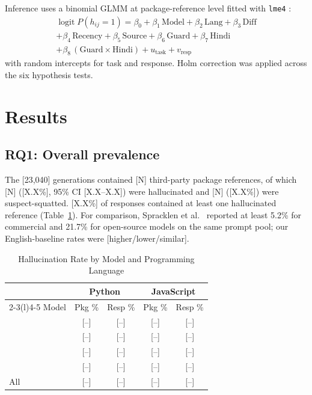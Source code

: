 \documentclass[conference]{IEEEtran}
\begin{document}
Inference uses a binomial GLMM at package-reference level fitted with \texttt{lme4} \cite{bates2015}:
\begin{multline}
\operatorname{logit} P(h_{ij}=1) = \beta_0 + \beta_1\,\text{Model} + \beta_2\,\text{Lang} + \beta_3\,\text{Diff} \\
+ \beta_4\,\text{Recency} + \beta_5\,\text{Source} + \beta_6\,\text{Guard} + \beta_7\,\text{Hindi} \\
+ \beta_8\,(\text{Guard}\times\text{Hindi}) + u_{\text{task}} + v_{\text{resp}}
\end{multline}
with random intercepts for task and response. Holm correction \cite{holm1979} was applied across the six hypothesis tests.

\section{Results}
\subsection{RQ1: Overall prevalence}
The [23,040] generations contained [N] third-party package references, of which [N] ([X.X\%], 95\% CI [X.X--X.X]) were hallucinated and [N] ([X.X\%]) were suspect-squatted. [X.X\%] of responses contained at least one hallucinated reference (Table~\ref{tab:bymodel}). For comparison, Spracklen et al.~\cite{spracklen2025} reported at least 5.2\% for commercial and 21.7\% for open-source models on the same prompt pool; our English-baseline rates were [higher/lower/similar].

\begin{table}[t]
\caption{Hallucination Rate by Model and Programming Language}
\label{tab:bymodel}
\centering
\begin{tabular}{@{}lcccc@{}}
\toprule
& \multicolumn{2}{c}{Python} & \multicolumn{2}{c}{JavaScript} \\
\cmidrule(lr){2-3}\cmidrule(l){4-5}
Model & Pkg \% & Resp \% & Pkg \% & Resp \% \\
\midrule
[Model A] & [--] & [--] & [--] & [--] \\
[Model B] & [--] & [--] & [--] & [--] \\
[Model C] & [--] & [--] & [--] & [--] \\
[Model D] & [--] & [--] & [--] & [--] \\
\midrule
All       & [--] & [--] & [--] & [--] \\
\bottomrule
\end{tabular}
\end{table}
\end{document}
